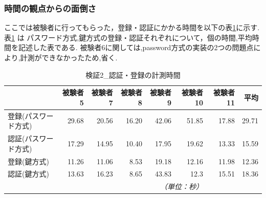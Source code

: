     \subsubsection{時間の観点からの面倒さ}
        ここでは被験者に行ってもらった，登録・認証にかかる時間を以下の表\ref{検証２ 認証・登録の計測時間}に示す.
        表\ref{検証２ 認証・登録の計測時間} は パスワード方式,鍵方式の登録・認証それぞれについて，個の時間,平均時間を記述した表である.
        被験者6に関しては,password方式の実装の2つの問題点により,計測ができなかったため,省く.
        \begin{table}[htb]
            \caption{検証2\_認証・登録の計測時間}
            \label{検証２ 認証・登録の計測時間}
            \begin{tabular}{|l|r|r|r|r|r|r|r|} \hline%
                                    & 被験者5 & 被験者7 & 被験者8 & 被験者9 & 被験者10 & 被験者11 & 平均 \\ \hline%
                登録(パスワード方式) & 29.68 & 20.56   & 16.20 & 42.06   & 51.85   & 17.88   & 29.71\\ \hline
                認証(パスワード方式) & 17.29 & 14.95   & 10.40 & 17.95   & 19.62   & 13.33   & 15.59\\ \hline
                登録(鍵方式)        & 11.26 & 11.06   & 8.53  & 19.18   & 12.16   & 11.98   & 12.36\\ \hline
                認証(鍵方式)        & 13.63 & 16.23   & 8.65  & 43.83   & 12.3    & 15.51   & 18.36\\ \hline
    
                \multicolumn{6}{r}{\small\it （単位：秒）}\\
            \end{tabular}
        \end{table}
    


